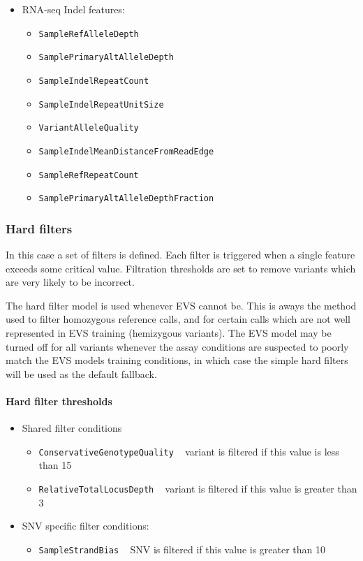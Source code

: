 \documentclass{article}
\begin{document}
\begin{itemize}
\begin{itemize}
    \end{itemize}
    \item RNA-seq Indel features:
    \begin{itemize}
        \item \texttt{SampleRefAlleleDepth}
        \item \texttt{SamplePrimaryAltAlleleDepth}
        \item \texttt{SampleIndelRepeatCount}
        \item \texttt{SampleIndelRepeatUnitSize}
        \item \texttt{VariantAlleleQuality}
        \item \texttt{SampleIndelMeanDistanceFromReadEdge}
        \item \texttt{SampleRefRepeatCount}
        \item \texttt{SamplePrimaryAltAlleleDepthFraction}
    \end{itemize}
\end{itemize}

\subsubsection{Hard filters}

In this case a set of filters is defined. Each filter is triggered when a single feature exceeds some critical value. Filtration thresholds are set to remove variants which are very likely to be incorrect.

The hard filter model is used whenever EVS cannot be. This is aways the method used to filter homozygous reference calls, and for certain calls which are not well represented in EVS training (hemizygous variants). The EVS model may be turned off for all variants whenever the assay conditions are suspected to poorly match the EVS models training conditions, in which case the simple hard filters will be used as the default fallback.

\paragraph{Hard filter thresholds}

\begin{itemize}
    \item Shared filter conditions
    \begin{itemize}
        \item \texttt{ConservativeGenotypeQuality} ~ variant is filtered if this value is less than 15
        \item \texttt{RelativeTotalLocusDepth} ~ variant is filtered if this value is greater than 3
    \end{itemize}
    \item SNV specific filter conditions:
    \begin{itemize}
        \item \texttt{SampleStrandBias} ~ SNV is filtered if this value is greater than 10
    \end{itemize}
\end{itemize}
\end{document}
